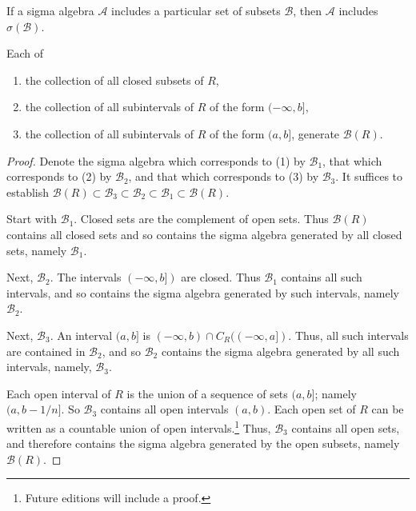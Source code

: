 \begin{proposition}
If a sigma algebra $\mathcal{A} $ includes a particular set of subsets $\mathcal{B} $, then $\mathcal{A} $ includes $\sigma (\mathcal{B} )$.\end{proposition}
\begin{proposition}

\label{borelalternategenerations}Each of
  \begin{enumerate}
    \item the collection of all closed subsets of $R$,
    \item the collection of all subintervals of $R$ of the form $(-\infty, b]$,
    \item the collection of all subintervals of $R$ of the form $(a, b]$,
generate $\mathcal{B} (R)$.
  \end{enumerate}\end{proposition}
\begin{proof}Denote the sigma algebra which corresponds to (1) by $\mathcal{B} _1$, that which corresponds to (2) by $\mathcal{B} _2$, and that which corresponds to (3) by $\mathcal{B} _3$.
It suffices to establish $\mathcal{B} (R) \subset \mathcal{B} _3 \subset \mathcal{B} _2 \subset \mathcal{B} _1 \subset \mathcal{B} (R)$.

Start with $\mathcal{B} _1$.
Closed sets are the complement of open sets.
Thus $\mathcal{B} (R)$ contains all closed sets and so contains the sigma algebra generated by all closed sets, namely $\mathcal{B} _1$.

Next, $\mathcal{B} _2$.
The intervals $(-\infty, b])$ are closed.
Thus $\mathcal{B} _1$ contains all such intervals, and so contains the sigma algebra generated by such intervals, namely $\mathcal{B} _2$.

Next, $\mathcal{B} _3$.
An interval $(a, b]$ is $(-\infty, b) \cap  C_R((-\infty, a])$.
Thus, all such intervals are contained in $\mathcal{B} _2$, and so $\mathcal{B} _2$ contains the sigma algebra generated by all such intervals, namely, $\mathcal{B} _3$.

Each open interval of $R$ is the union of a sequence of sets $(a, b]$; namely $(a, b-1/n]$.
So $\mathcal{B} _3$ contains all open intervals $(a, b)$.
Each open set of $R$ can be written as a countable union of open intervals.\footnote{Future editions will include a proof.}
Thus, $\mathcal{B} _3$ contains all open sets, and therefore contains the sigma algebra generated by the open subsets, namely $\mathcal{B} (R)$.
\end{proof}
